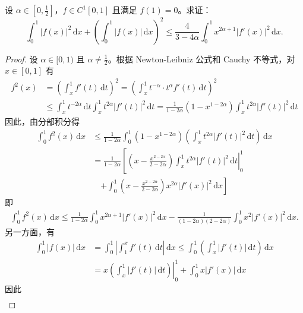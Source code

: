 \documentclass[../../main.tex]{subfiles}%
\begin{document}
\begin{example}
设 \( \alpha \in \left[0, \frac{1}{2}\right] \)，\( f \in C^1[0,1] \) 且满足 \( f(1) = 0 \)。求证：
\[
\int_{0}^{1} |f(x)|^2 \, \mathrm{d}x + \left( \int_{0}^{1} |f(x)| \, \mathrm{d}x \right)^2 \leqslant \frac{4}{3 - 4\alpha} \int_{0}^{1} x^{2\alpha + 1} |f'(x)|^2 \, \mathrm{d}x.
\]
\end{example}
\begin{proof}
设 \( \alpha \in [0,1) \) 且 \( \alpha \neq \frac{1}{2} \)。根据 Newton-Leibniz 公式和 Cauchy 不等式，对 \( x \in [0,1] \) 有
\begin{align*}
f^2(x) &= \left( \int_{x}^{1} f'(t) \, \mathrm{d}t \right)^2 = \left( \int_{x}^{1} t^{-\alpha} \cdot t^{\alpha} f'(t) \, \mathrm{d}t \right)^2 \\
&\leqslant \int_{x}^{1} t^{-2\alpha} \, \mathrm{d}t \int_{x}^{1} t^{2\alpha} |f'(t)|^2 \, \mathrm{d}t = \frac{1}{1 - 2\alpha} (1 - x^{1 - 2\alpha}) \int_{x}^{1} t^{2\alpha} |f'(t)|^2 \, \mathrm{d}t
\end{align*}
因此，由分部积分得
\begin{align*}
\int_{0}^{1} f^2(x) \, \mathrm{d}x &\leqslant \frac{1}{1 - 2\alpha} \int_{0}^{1} (1 - x^{1 - 2\alpha}) \left( \int_{x}^{1} t^{2\alpha} |f'(t)|^2 \, \mathrm{d}t \right) \, \mathrm{d}x \\
&= \frac{1}{1 - 2\alpha} \left[ \left. \left( x - \frac{x^{2 - 2\alpha}}{2 - 2\alpha} \right) \int_{x}^{1} t^{2\alpha} |f'(t)|^2 \, \mathrm{d}t \right|_{0}^{1} \right. \\
&\quad \left. + \int_{0}^{1} \left( x - \frac{x^{2 - 2\alpha}}{2 - 2\alpha} \right) x^{2\alpha} |f'(x)|^2 \, \mathrm{d}x \right]
\end{align*}
即
\begin{align}
\int_{0}^{1} f^2(x) \, \mathrm{d}x \leqslant \frac{1}{1 - 2\alpha} \int_{0}^{1} x^{2\alpha + 1} |f'(x)|^2 \, \mathrm{d}x - \frac{1}{(1 - 2\alpha)(2 - 2\alpha)} \int_{0}^{1} x^2 |f'(x)|^2 \, \mathrm{d}x .\label{eq:::23523523424jrioj5335}
\end{align}
另一方面，有
\begin{align*}
\int_{0}^{1} |f(x)| \, \mathrm{d}x &= \int_{0}^{1} \left| \int_{1}^{x} f'(t) \, \mathrm{d}t \right| \, \mathrm{d}x \leqslant \int_{0}^{1} \left( \int_{x}^{1} |f'(t)| \, \mathrm{d}t \right) \, \mathrm{d}x \\
&= \left. x \left( \int_{x}^{1} |f'(t)| \, \mathrm{d}t \right) \right|_{0}^{1} + \int_{0}^{1} x |f'(x)| \, \mathrm{d}x
\end{align*}
因此
\begin{align}

\end{align}
\end{proof}
\end{document}
